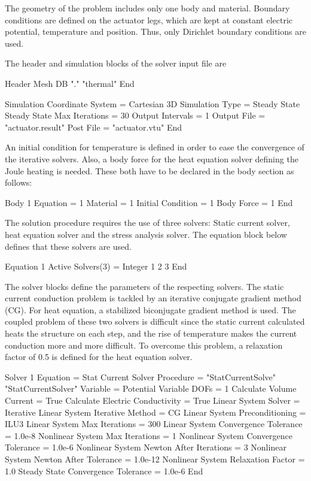 The geometry of the problem includes only one body and
material. Boundary conditions are defined on the actuator legs, which
are kept at constant electric potential, temperature and
position. Thus, only Dirichlet boundary conditions are used.

The header and simulation blocks of the solver input file are

\ttbegin
Header
  Mesh DB "." "thermal"
End

Simulation
  Coordinate System = Cartesian 3D
  Simulation Type = Steady State
  Steady State Max Iterations = 30
  Output Intervals = 1
  Output File = "actuator.result"
  Post File = "actuator.vtu"
End
\ttend

An initial condition for temperature is defined in order to ease the
convergence of the iterative solvers. Also, a body force for the
heat equation solver defining the Joule heating is needed. These
both have to be declared in the body section as follows:

\ttbegin
Body 1
  Equation = 1
  Material = 1
  Initial Condition = 1
  Body Force = 1
End
\ttend

The solution procedure requires the use of three solvers: Static
current solver, heat equation solver and the stress analysis
solver. The equation block below defines that these solvers are
used. 

\ttbegin
Equation 1
  Active Solvers(3) = Integer 1 2 3
End
\ttend

The solver blocks define the parameters of the respecting solvers. The
static current conduction problem is tackled by an iterative conjugate
gradient method (CG). For heat equation, a stabilized biconjugate
gradient method is used. The coupled problem of these two solvers is
difficult since the static current calculated heats the structure on
each step, and the rise of temperature makes the current conduction
more and more difficult. To overcome this problem, a relaxation factor
of 0.5 is defined for the heat equation solver.

\ttbegin
Solver 1
  Equation = Stat Current Solver
  Procedure = "StatCurrentSolve" "StatCurrentSolver"
  Variable = Potential
  Variable DOFs = 1
  Calculate Volume Current = True
  Calculate Electric Conductivity = True
  Linear System Solver = Iterative
  Linear System Iterative Method = CG
  Linear System Preconditioning = ILU3
  Linear System Max Iterations = 300
  Linear System Convergence Tolerance = 1.0e-8
  Nonlinear System Max Iterations = 1
  Nonlinear System Convergence Tolerance = 1.0e-6
  Nonlinear System Newton After Iterations = 3
  Nonlinear System Newton After Tolerance = 1.0e-12
  Nonlinear System Relaxation Factor = 1.0
  Steady State Convergence Tolerance = 1.0e-6
End

